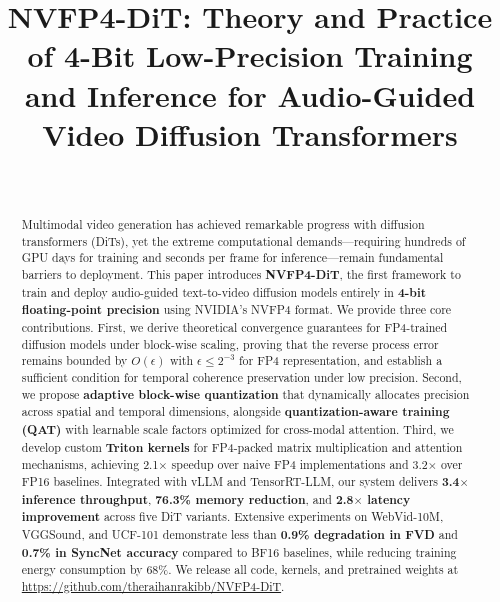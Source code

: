\documentclass[journal]{IEEEtran}
\theoremstyle{definition}
\theoremstyle{remark}
\begin{document}
\title{NVFP4-DiT: Theory and Practice of 4-Bit Low-Precision Training and Inference for Audio-Guided Video Diffusion Transformers}

\author{
    \\
}

\maketitle

\begin{abstract}
Multimodal video generation has achieved remarkable progress with diffusion transformers (DiTs), yet the extreme computational demands---requiring hundreds of GPU days for training and seconds per frame for inference---remain fundamental barriers to deployment. This paper introduces \textbf{NVFP4-DiT}, the first framework to train and deploy audio-guided text-to-video diffusion models entirely in \textbf{4-bit floating-point precision} using NVIDIA's NVFP4 format. We provide three core contributions. First, we derive theoretical convergence guarantees for FP4-trained diffusion models under block-wise scaling, proving that the reverse process error remains bounded by $O(\epsilon)$ with $\epsilon \leq 2^{-3}$ for FP4 representation, and establish a sufficient condition for temporal coherence preservation under low precision. Second, we propose \textbf{adaptive block-wise quantization} that dynamically allocates precision across spatial and temporal dimensions, alongside \textbf{quantization-aware training (QAT)} with learnable scale factors optimized for cross-modal attention. Third, we develop custom \textbf{Triton kernels} for FP4-packed matrix multiplication and attention mechanisms, achieving 2.1$\times$ speedup over naive FP4 implementations and 3.2$\times$ over FP16 baselines. Integrated with vLLM and TensorRT-LLM, our system delivers \textbf{3.4$\times$ inference throughput}, \textbf{76.3\% memory reduction}, and \textbf{2.8$\times$ latency improvement} across five DiT variants. Extensive experiments on WebVid-10M, VGGSound, and UCF-101 demonstrate less than \textbf{0.9\% degradation in FVD} and \textbf{0.7\% in SyncNet accuracy} compared to BF16 baselines, while reducing training energy consumption by 68\%. We release all code, kernels, and pretrained weights at \url{https://github.com/theraihanrakibb/NVFP4-DiT}.
\end{abstract}
\end{document}
